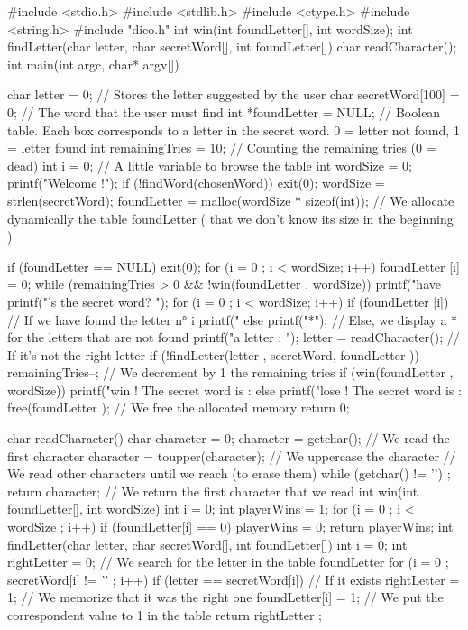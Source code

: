 \begin{Csource}
  #include <stdio.h>
  #include <stdlib.h>
  #include <ctype.h>
  #include <string.h>
  #include "dico.h"
  int win(int foundLetter[], int wordSize);
  int findLetter(char letter, char secretWord[], int foundLetter[])
  char readCharacter();
  int main(int argc, char* argv[])
  {
  	char letter = 0; // Stores the letter suggested by the user
  	char secretWord[100] = {0}; // The word that the user must find
  	int *foundLetter = NULL; // Boolean table. Each box corresponds to a letter in the secret word. 0 = letter not found, 1 = letter found
  	int remainingTries = 10; // Counting the remaining tries  (0 = dead)
  	int i = 0; // A little variable to browse the table
  	int wordSize = 0;
  	printf("Welcome !\n\n");
  	if (!findWord(chosenWord))
  	 	exit(0);
  	wordSize = strlen(secretWord);
  	foundLetter = malloc(wordSize  * sizeof(int)); // We allocate dynamically the table foundLetter ( that we don't know its size in the beginning )

  	if (foundLetter  == NULL)
  		 exit(0);
  	for (i = 0 ; i < wordSize; i++)
      		 foundLetter [i] = 0;
  	while (remainingTries > 0 && !win(foundLetter , wordSize))
  	{
      		printf("\n\nYou have %
      		printf("\nWhat’s the secret word? ");
      		for (i = 0 ; i < wordSize; i++)
      		{
          			if (foundLetter [i]) // If we have found the letter n° i
  		      		printf("%
  		        	else
  		            	printf("*"); // Else, we display a * for the letters that are not found
      		}
      		 printf("\nSuggest a letter : ");
  	    	letter = readCharacter();
  	    	// If it's not the right letter
  	    	if (!findLetter(letter , secretWord, foundLetter ))
  	    	{
  		        	 remainingTries--; // We decrement by 1 the remaining tries
      		}
  	}
  	if (win(foundLetter , wordSize))
  	    	printf("\n\nYou win ! The secret word is : %
  	else
  	    	printf("\n\nTou lose ! The secret word is : %
  	free(foundLetter ); // We free the allocated memory
      	return 0;
  }
  char readCharacter()
  {
  	char character = 0;
  	character = getchar(); // We read the first character
  	character = toupper(character); // We uppercase the character
  	// We read other characters until we reach \n (to erase them)
  	while (getchar() != '\n') ;
  	return character; // We return the first character that we read
  }
  int win(int foundLetter[], int wordSize)
  {
  	int i = 0;
  	int playerWins = 1;
  	for (i = 0 ; i < wordSize ; i++)
  	{
      		if (foundLetter[i] == 0)
          			playerWins = 0;
  	}
  	return playerWins;
  }
  int findLetter(char letter, char secretWord[], int foundLetter[])
  {
  	int i = 0;
  	int rightLetter = 0;
  	// We search for the letter in the table foundLetter
  	for (i = 0 ; secretWord[i] != '\0' ; i++)
  	{
      		if (letter == secretWord[i]) // If it exists
      		{
          			rightLetter = 1; // We memorize that it was the right one
          			 foundLetter[i] = 1; // We put the correspondent value to 1 in the table
      		}
  	}
  	return rightLetter ;
  }
\end{Csource}

